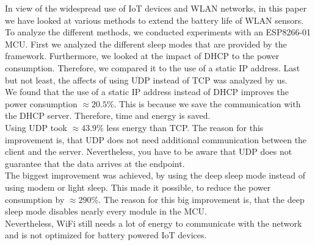 In view of the widespread use of IoT devices and WLAN networks, in this paper we have looked at various methods to extend the battery life of WLAN sensors.
To analyze the different methods, we conducted experiments with an ESP8266-01 MCU.
First we analyzed the different sleep modes that are provided by the framework. 
Furthermore, we looked at the impact of DHCP to the power consumption. Therefore, we compared it to the use of a static IP address.
Last but not least, the affects of using UDP instead of TCP was analyzed by us.
\\
We found that the use of a static IP address instead of DHCP improves the power consumption $\approx 20.5\%$.
This is because we save the communication with the DHCP server. Therefore, time and energy is saved.
\\
Using UDP took $\approx 43.9\%$ less energy than TCP. 
The reason for this improvement is, that UDP does not need additional communication between the client and the server.
Nevertheless, you have to be aware that UDP does not guarantee that the data arrives at the endpoint.
\\
The biggest improvement was achieved, by using the deep sleep mode instead of using modem or light sleep.
This made it possible, to reduce the power consumption by $\approx 290\%$.
The reason for this big improvement is, that the deep sleep mode disables nearly every module in the MCU.
\\
Nevertheless, WiFi still needs a lot of energy to communicate with the network and is not optimized for battery powered IoT devices.

